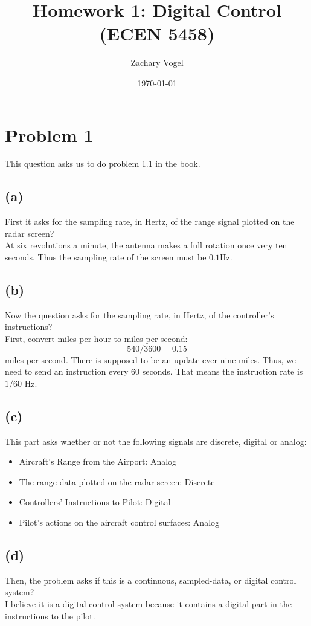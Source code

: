 \documentclass{article}
\title{Homework 1: Digital Control (ECEN 5458)}
\author{Zachary Vogel}
\date{\today}
\begin{document}
\maketitle

\section*{Problem 1}
This question asks us to do problem 1.1 in the book.
\subsection*{(a)}
First it asks for the sampling rate, in Hertz, of the range signal plotted on the radar screen?\\
At six revolutions a minute, the antenna makes a full rotation once very ten seconds. Thus the sampling rate of the screen must be $0.1$Hz.

\subsection*{(b)}
Now the question asks for the sampling rate, in Hertz, of the controller's instructions?\\
First, convert miles per hour to miles per second:
\[540/3600=0.15\]
miles per second. There is supposed to be an update ever nine miles. Thus, we need to send an instruction every 60 seconds. That means the instruction rate is $1/60$ Hz.

\subsection*{(c)}
This part asks whether or not the following signals are discrete, digital or analog:
\begin{itemize}
    \item Aircraft's Range from the Airport: Analog
    \item The range data plotted on the radar screen: Discrete
    \item Controllers' Instructions to Pilot: Digital
    \item Pilot's actions on the aircraft control surfaces: Analog
\end{itemize}

\subsection*{(d)}
Then, the problem asks if this is a continuous, sampled-data, or digital control system?\\
I believe it is a digital control system because it contains a digital part in the instructions to the pilot.
\end{document}
